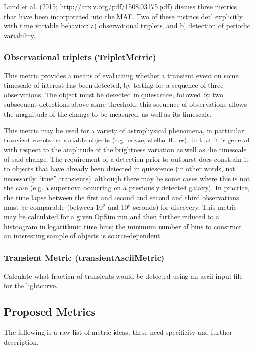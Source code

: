 Lund et al. (2015; \url{http://arxiv.org/pdf/1508.03175.pdf}) discuss three metrics that have been incorporated into the MAF. Two of these metrics deal explicitly with time variable behavior: a) observational triplets, and b) detection of periodic variability.

\subsubsection{Observational triplets (TripletMetric)}

This metric provides a means of evaluating whether a transient event on some timescale of interest has been detected, by testing for a sequence of three observations. The object must be detected in quiescence, followed by two subsequent detections above some threshold; this sequence of observations allows the magnitude of the change to be measured, as well as its timescale.

This metric may be used for a variety of astrophysical phenomena, in particular transient events on variable objects (e.g. novae, stellar flares), in that it is general with respect to the amplitude of the brightness variation as well as the timescale of said change. The requirement of a detection prior to outburst does constrain it to objects that have already been detected in quiescence (in other words, not necessarily ``true'' transients), although there may be some cases where this is not the case (e.g. a supernova occurring on a previously detected galaxy). In practice, the time lapse between the first and second and second and third observations must be comparable (between 10$^2$ and 10$^5$ seconds) for discovery. This metric may be calculated for a given OpSim run and then further reduced to a histoogram in logarithmic time bins; the minimum number of bins to construct an interesting sample of objects is source-dependent.

\subsubsection{Transient Metric (transientAsciiMetric)}

Calculate what fraction of transients would be detected using an ascii input file for the lightcurve.

\subsection{Proposed Metrics}

The following is a raw list of metric ideas; these need specificity and further description.

